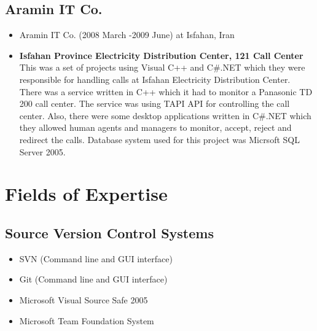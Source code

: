 \documentclass[12pt,a4paper]{article}
\begin{document}
	\subsection{Aramin IT Co.}
		\begin{itemize}
			\item Aramin IT Co. (2008 March -2009 June) at Isfahan, Iran
			\item \small \textbf{Isfahan Province Electricity Distribution Center, 121 Call Center} \\					
			This was a set of projects using Visual C++ and C\#.NET which they were responsible for handling calls at Isfahan Electricity Distribution Center. There was a service written in C++ which it had to monitor a Panasonic TD 200 call center. The service was using TAPI API for controlling the call center. Also, there were some desktop applications written in C\#.NET which they allowed human agents and managers to monitor, accept, reject and redirect the calls. Database system used for this project was Micrsoft SQL Server 2005.
		\end{itemize}
		
\section{Fields of Expertise}
	\subsection{Source Version Control Systems}
		\begin{itemize}
			\item SVN (Command line and GUI interface)
			\item Git (Command line and GUI interface)
			\item Microsoft Visual Source Safe 2005
			\item Microsoft Team Foundation System
		\end{itemize}
\end{document}
